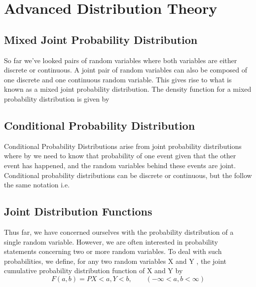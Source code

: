 \chapter{Advanced Distribution Theory}

\section{Mixed Joint Probability Distribution}
So far we've looked pairs of random variables where both variables are either discrete or continuous. A joint pair of random variables can also be composed of one discrete and one continuous random variable. This gives rise to what is known as a mixed joint probability distribution.
The density function for a mixed probability distribution is given by




\section{Conditional Probability Distribution}

Conditional Probability Distributions arise from joint probability distributions where by we need to know that probability of one event given that the other event has happened, and the random variables behind these events are joint.
Conditional probability distributions can be discrete or continuous, but the follow the same notation i.e.

\section{Joint Distribution Functions }

Thus far, we have concerned ourselves with the probability
distribution of a single random variable. However, we are often
interested in probability statements concerning two or more random
variables. To deal with such probabilities, we define, for any two
random variables X and Y , the joint cumulative probability
distribution function of X and Y by
\\
\begin{equation}
F(a,b) = P{X < a,Y < b},\qquad (-\infty < a,b < \infty)
\end{equation}



